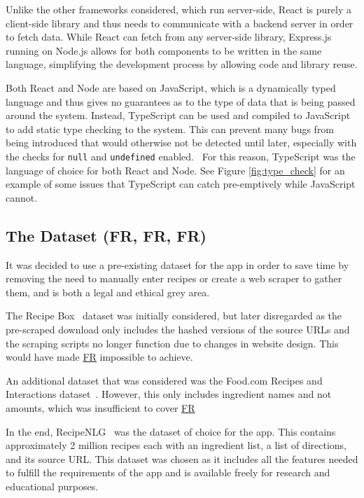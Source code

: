 Unlike the other frameworks considered, which run server-side, React is purely a client-side library and thus
needs to communicate with a backend server in order to fetch data. While React can fetch from any server-side
library, Express.js running on Node.js allows for both components to be written in the same language, simplifying
the development process by allowing code and library reuse.

Both React and Node are based on JavaScript, which is a dynamically typed language and thus gives no guarantees
as to the type of data that is being passed around the system. Instead, TypeScript can be used and compiled to
JavaScript to add static type checking to the system. This can prevent many bugs from being introduced that would
otherwise not be detected until later, especially with the checks for \texttt{null} and \texttt{undefined} enabled.~\cite{gao_type_2017}
For this reason, TypeScript was the language of choice for both React and Node. See Figure \ref{fig:type_check} for an
example of some issues that TypeScript can catch pre-emptively while JavaScript cannot.

\subsection{The Dataset (FR, FR, FR)}\label{sec:data_pre_process}

It was decided to use a pre-existing dataset for the app in order to save time by removing the need to manually enter recipes
or create a web scraper to gather them, and is both a legal and ethical grey area.~\cite{murray_state_university_legality_2020}

The Recipe Box~\cite{lee_recipe_2017} dataset was initially considered, but later disregarded as the pre-scraped download only includes the
hashed versions of the source URLs and the scraping scripts no longer function due to changes in website design. This would have made
\hyperref[req:sources]{FR} impossible to achieve.

An additional dataset that was considered was the Food.com Recipes and Interactions dataset~\cite{li_foodcom_2019}. However, this only includes
ingredient names and not amounts, which was insufficient to cover \hyperref[req:track_amounts]{FR}

In the end, RecipeNLG~\cite{bien_recipenlg_2020} was the dataset of choice for the \chef{} app. This contains approximately 2 million recipes
each with an ingredient list, a list of directions, and its source URL. This dataset was chosen as it includes all the features needed to
fulfill the requirements of the app and is available freely for research and educational purposes.

